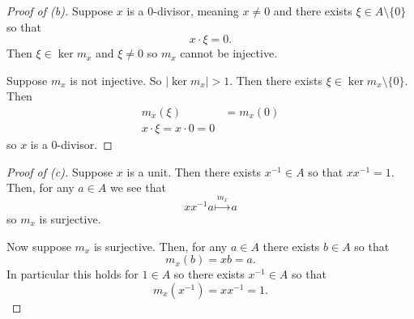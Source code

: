 \begin{proof}[Proof of (b)]
    Suppose $x$ is a $0$-divisor, meaning $x \neq 0$ and there  
    exists $\xi \in A\setminus \{0\}$ so that 
    \[
        x \cdot \xi = 0.
    \]
    Then $\xi \in \ker m_x$ and $\xi \neq 0$ so 
    $m_x$ cannot be injective. 

    Suppose $m_x$ is not injective. 
    So $|\ker m_x| > 1$. Then there exists 
    $\xi \in \ker m_x \setminus \{0\}$. 
    Then 
    \begin{align*}
        m_x(\xi) &= m_x(0) \\ 
        x \cdot \xi = x \cdot 0 = 0
    \end{align*}
    so $x$ is a $0$-divisor.
\end{proof}
\begin{proof}[Proof of (c)]
    Suppose $x$ is a unit. Then there exists 
    $x^{-1} \in A$ so that 
    $xx^{-1} = 1$. 
    Then, for any $a \in A$ we see that 
    \[
        xx^{-1}a \overset{m_x}{\mapsto} a
    \]
    so $m_x$ is surjective. 

    Now suppose $m_x$ is surjective. Then, for 
    any $a \in A$ there exists $b \in A$ so that 
    \[
        m_x(b) = xb = a. 
    \]
    In particular this holds 
    for $1 \in A$ so there exists $x^{-1} \in A$ so that 
    \[
        m_x(x^{-1}) = xx^{-1} = 1. 
    \]
\end{proof}

